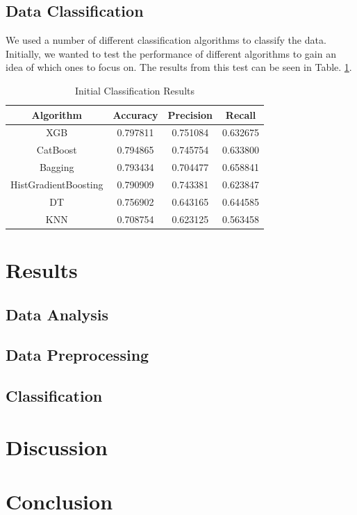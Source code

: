 \documentclass[conference]{IEEEtran}
\begin{document}
\subsection{Data Classification}

We used a number of different classification algorithms to classify the data. Initially, we wanted to test the performance of different algorithms to gain an idea of which ones to focus on. The results from this test can be seen in Table. \ref{tab:initial-clf-results}.

\begin{table}[h]
  \centering
  \caption{Initial Classification Results}
  \label{tab:initial-clf-results}
  \begin{tabular}{|c|c|c|c|}
    \hline
    \textbf{Algorithm} & \textbf{Accuracy} & \textbf{Precision} & \textbf{Recall} \\ \hline
    XGB	& 0.797811 & 0.751084 & 0.632675 \\
    \hline
    CatBoost & 0.794865 & 0.745754 & 0.633800 \\
    \hline
    Bagging & 0.793434 & 0.704477 & 0.658841 \\
    \hline
    HistGradientBoosting & 0.790909 & 0.743381 & 0.623847 \\
    \hline
    DT & 0.756902 & 0.643165 & 0.644585 \\
    \hline
    KNN & 0.708754 & 0.623125 & 0.563458 \\
    \hline
  \end{tabular}
\end{table}

\section{Results} \label{ref:results}

\subsection{Data Analysis}

\subsection{Data Preprocessing}

\subsection{Classification}

\section{Discussion}

\section{Conclusion}



\end{document}
